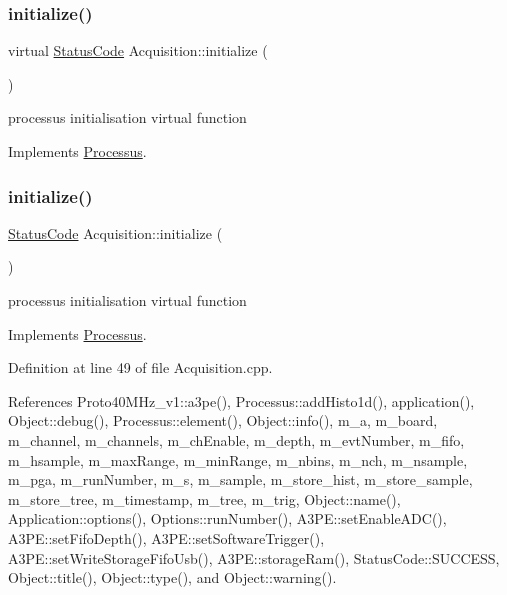 \subsubsection{\texorpdfstring{initialize()}{initialize()}\hspace{0.1cm}{\footnotesize\ttfamily [1/2]}}
{\footnotesize\ttfamily virtual \hyperlink{classStatusCode}{Status\+Code} Acquisition\+::initialize (\begin{DoxyParamCaption}{ }\end{DoxyParamCaption})\hspace{0.3cm}{\ttfamily [virtual]}}

processus initialisation virtual function 

Implements \hyperlink{classProcessus_aee88ad7b77ae7319cf8b128e9dd2ea11}{Processus}.

\mbox{\label{classAcquisition_acffc6b70b80811657409f92e489584ba}} 
\subsubsection{\texorpdfstring{initialize()}{initialize()}\hspace{0.1cm}{\footnotesize\ttfamily [2/2]}}
{\footnotesize\ttfamily \hyperlink{classStatusCode}{Status\+Code} Acquisition\+::initialize (\begin{DoxyParamCaption}{ }\end{DoxyParamCaption})\hspace{0.3cm}{\ttfamily [virtual]}}

processus initialisation virtual function 

Implements \hyperlink{classProcessus_aee88ad7b77ae7319cf8b128e9dd2ea11}{Processus}.



Definition at line 49 of file Acquisition.\+cpp.



References Proto40\+M\+Hz\+\_\+v1\+::a3pe(), Processus\+::add\+Histo1d(), application(), Object\+::debug(), Processus\+::element(), Object\+::info(), m\+\_\+a, m\+\_\+board, m\+\_\+channel, m\+\_\+channels, m\+\_\+ch\+Enable, m\+\_\+depth, m\+\_\+evt\+Number, m\+\_\+fifo, m\+\_\+hsample, m\+\_\+max\+Range, m\+\_\+min\+Range, m\+\_\+nbins, m\+\_\+nch, m\+\_\+nsample, m\+\_\+pga, m\+\_\+run\+Number, m\+\_\+s, m\+\_\+sample, m\+\_\+store\+\_\+hist, m\+\_\+store\+\_\+sample, m\+\_\+store\+\_\+tree, m\+\_\+timestamp, m\+\_\+tree, m\+\_\+trig, Object\+::name(), Application\+::options(), Options\+::run\+Number(), A3\+P\+E\+::set\+Enable\+A\+D\+C(), A3\+P\+E\+::set\+Fifo\+Depth(), A3\+P\+E\+::set\+Software\+Trigger(), A3\+P\+E\+::set\+Write\+Storage\+Fifo\+Usb(), A3\+P\+E\+::storage\+Ram(), Status\+Code\+::\+S\+U\+C\+C\+E\+SS, Object\+::title(), Object\+::type(), and Object\+::warning().




